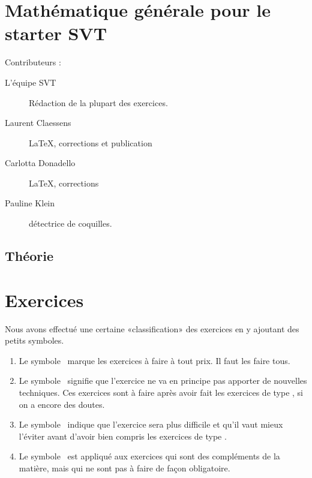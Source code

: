 \chapter{Mathématique générale pour le starter SVT}

Contributeurs :
\begin{description}
    \item[L'équipe SVT] Rédaction de la plupart des exercices.
    \item[Laurent Claessens] \LaTeX, corrections et publication
    \item[Carlotta Donadello] \LaTeX, corrections
    \item[Pauline Klein] détectrice de coquilles.
\end{description}

\section{Théorie}



\chapter{Exercices}

Nous avons effectué une certaine «classification» des exercices en y ajoutant des petits symboles.
\begin{enumerate}
	\item Le symbole \minsyndical\ marque les exercices à faire à tout prix. Il faut les faire tous.
	\item Le symbole \boringexo\ signifie que l'exercice ne va en principe pas apporter de nouvelles techniques. Ces exercices sont à faire après avoir fait les exercices de type \minsyndical, si on a encore des doutes.
	\item Le symbole \coolexo\ indique que l'exercice sera plus difficile et qu'il vaut mieux l'éviter avant d'avoir bien compris les exercices de type \minsyndical.
	\item Le symbole \mortelexo\ est appliqué aux exercices qui sont des compléments de la matière, mais qui ne sont pas à faire de façon obligatoire.
\end{enumerate}

